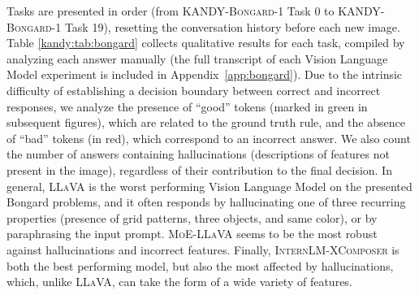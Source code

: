 Tasks are presented in order (from \textsc{KANDY-Bongard-1} Task 0 to \textsc{KANDY-Bongard-1} Task 19), resetting the conversation history before each new image.
Table \ref{kandy:tab:bongard} collects qualitative results for each task, compiled by analyzing each answer manually (the full transcript of each Vision Language Model experiment is included in Appendix~\ref{app:bongard}). Due to the intrinsic difficulty of establishing a decision boundary between correct and incorrect responses, we analyze the presence of ``good'' tokens (marked in green in subsequent figures), which are related to the ground truth rule, and the absence of ``bad'' tokens (in red), which correspond to an incorrect answer. We also count the number of answers containing hallucinations (descriptions of features not present in the image), regardless of their contribution to the final decision.
%
In general, \textsc{LLaVA} is the worst performing Vision Language Model on the presented Bongard problems, and it often responds by hallucinating one of three recurring properties (presence of grid patterns, three objects, and same color), or by paraphrasing the input prompt. \textsc{MoE-LLaVA} seems to be the most robust against hallucinations and incorrect features. Finally, \textsc{InternLM-XComposer} is both the best performing model, but also the most affected by hallucinations, which, unlike \textsc{LLaVA}, can take the form of a wide variety of features.
%
